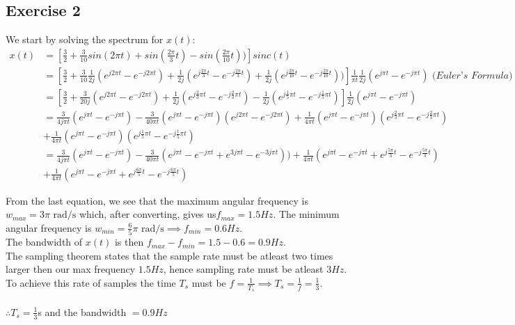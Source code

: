 \documentclass[a4paper]{article}
\begin{document}
\subsection{Exercise 2}
We start by solving the spectrum for $x(t)$:
\begin{align*}
    x(t) &= [\frac{3}{2} + \frac{3}{10}sin(2\pi t)+sin(\frac{2\pi}{3}t)-sin(\frac{2\pi}{10}t))]sinc(t)\\
     &=  [\frac{3}{2}+\frac{3}{10}\frac{1}{2j}(e^{j2\pi t}-e^{-j2\pi t})+\frac{1}{2j}(e^{j\frac{2\pi}{3} t}-e^{-j\frac{2\pi}{3} t})+\frac{1}{2j}(e^{j\frac{2\pi}{10} t}-e^{-j\frac{2\pi}{10} t}))]\frac{1}{\pi t}\frac{1}{2j}(e^{j\pi t}-e^{-j\pi t})\textit{ (Euler's Formula)}\\
     &= [\frac{3}{2}+\frac{3}{20 j}(e^{j2\pi t}-e^{-j2\pi t})+\frac{1}{2 j}(e^{j\frac{2}{3}\pi t}-e^{-j\frac{2}{3}\pi t})-\frac{1}{2j}(e^{j\frac{1}{5}\pi t}-e^{-j\frac{1}{5}\pi t})]\frac{1}{2j}(e^{j\pi t}-e^{-j\pi t}) \\
     &=  \frac{3}{4j\pi t}(e^{j\pi t}-e^{-j\pi t})-\frac{3}{40\pi t}(e^{j\pi t}-e^{-j\pi t})(e^{j2\pi t}-e^{-j2\pi t})+\frac{1}{4\pi t}(e^{j\pi t}-e^{-j\pi t})(e^{j\frac{2}{3}\pi t}-e^{-j\frac{2}{3}\pi t}) \\
     &+\frac{1}{4\pi t}(e^{j\pi t}-e^{-j\pi t})(e^{j\frac{1}{5}\pi t}-e^{-j\frac{1}{5}\pi t}) \\
     &= \frac{3}{4j\pi t}(e^{j\pi t}-e^{-j\pi t})-\frac{3}{40\pi t}(e^{j\pi t}-e^{-j\pi t}+e^{3j\pi t}-e^{-3j\pi t}))+\frac{1}{4\pi t}(e^{j\pi t}-e^{-j\pi t}+e^{j\frac{5\pi}{3} t}-e^{-j\frac{5\pi}{3} t}) \\
     &+\frac{1}{4\pi t}(e^{j\pi t}-e^{-j\pi t}+e^{j\frac{6\pi}{5} t}-e^{-j\frac{6\pi}{5} t})
  \end{align*}
  
From the last equation, we see that the maximum angular frequency is $w_{max} = 3\pi \text{ rad/s}$ which, after converting, gives us$ f_{max} = 1.5 Hz$. The minimum angular frequency is $w_{min} = \frac{6}{5}\pi \text{ rad/s} \implies f_{min} = 0.6 Hz$. \\
The bandwidth of $x(t)$ is then $f_{max}-f_{min} = 1.5-0.6 = 0.9 Hz$.\\
The sampling theorem states that the sample rate must be atleast two times larger then our max frequency $1.5 Hz$, hence sampling rate must be atleast $3 Hz$. To achieve this rate of samples the time $T_s$ must be $f=\frac{1}{T_s} \implies T_s = \frac{1}{f} = \frac{1}{3}$. \\
 \\
 $\therefore T_s = \frac{1}{3}$s and the bandwidth $ = 0.9 Hz$
\end{document}
